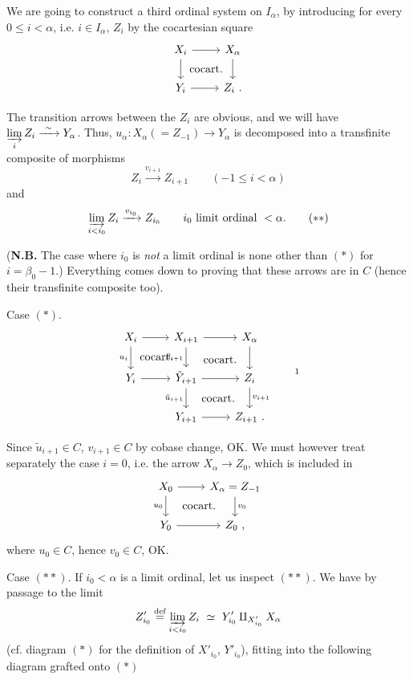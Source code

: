 We are going to construct a third ordinal system on $I_\alpha$, by introducing for every $0 \leq i < \alpha$, i.e. $i \in I_\alpha$, $Z_i$ by the cocartesian square
\[
\begin{tikzcd}
X_i \arrow[r] \arrow[d] \arrow[dr, phantom, "\text{cocart.}"] & X_\alpha \arrow[d] \\
Y_i \arrow[r] & Z_i\ .
\end{tikzcd}
\]

The transition arrows between the $Z_i$ are obvious, and we will have $\varinjlim\limits_{i} Z_i \xrightarrow{\ \sim\ } Y_\alpha$. Thus, $u_\alpha : X_\alpha (= Z_{-1}) \longrightarrow Y_\alpha$ is decomposed into a transfinite composite of morphisms
\[
Z_i \xrightarrow{v_{i+1}} Z_{i+1} \qquad (-1 \leq i < \alpha)
\tag*{$(*)$}
\]
and
\[
\varinjlim_{i<i_0} Z_i \xrightarrow{v_{i_0}} Z_{i_0} \qquad i_0 \text{ limit ordinal } < \alpha.
\tag*{$(**)$}
\]

(\textbf{N.B.} The case where $i_0$ is \textit{not} a limit ordinal is none other than $(*)$ for $i = \beta_0 - 1$.) Everything comes down to proving that these arrows are in $C$ (hence their transfinite composite too). %

Case $(*)$.
\[
\begin{tikzcd}
X_i \arrow[r] \arrow[d, "u_i"'] \arrow[dr, phantom, "\text{cocart.}"] & X_{i+1} \arrow[r] \arrow[d, "\beta_{i+1}"'] \arrow[dr, phantom, "\text{cocart.}"] & X_\alpha \arrow[d] \\
Y_i \arrow[r] & \tilde{Y}_{i+1} \arrow[r] \arrow[d, "\tilde{u}_{i+1}"'] \arrow[dr, phantom, "\text{cocart.}"] & Z_i \arrow[d, "v_{i+1}"] \\
& Y_{i+1} \arrow[r] & Z_{i+1}\ .
\end{tikzcd}
\tag*{\footnotemark}
\]

Since $\tilde{u}_{i+1} \in C$, $v_{i+1} \in C$ by cobase change, OK. We must however treat separately the case $i = 0$, i.e. the arrow $X_\alpha \longrightarrow Z_0$, which is included in
\[
\begin{tikzcd}
X_0 \arrow[r] \arrow[d, "u_0"'] \arrow[dr, phantom, "\text{cocart.}"] & X_\alpha = Z_{-1} \arrow[d, "v_0"] \\
Y_0 \arrow[r] & Z_0\ ,
\end{tikzcd}
\]
where $u_0 \in C$, hence $v_0 \in C$, OK.

Case $(**)$. If $i_0 < \alpha$ is a limit ordinal, let us inspect $(**)$. We have by passage to the limit
\[
Z'_{i_0} \overset{\text{def}}{=} \varinjlim_{i<i_0} Z_i \ \simeq\ Y'_{i_0} \amalg_{X'_{i_0}} X_\alpha
\]
(cf. diagram $(*)$ for the definition of $X'_{i_0}$, $Y'_{i_0}$), fitting into the following diagram grafted onto $(*)$